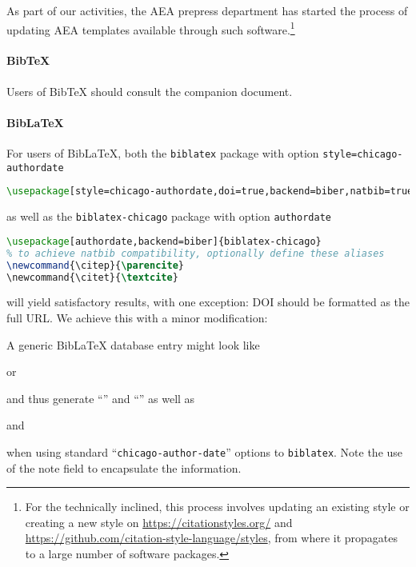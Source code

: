\documentclass[AEJ]{AEA}
\newcommand{\citep}{\parencite}
\newcommand{\citet}{\textcite}
\begin{document}
As part of our activities, the AEA prepress department has started the process of updating AEA templates available through such software.\footnote{For the technically inclined, this process involves updating an existing style or creating a new style on \url{https://citationstyles.org/} and \url{https://github.com/citation-style-language/styles}, from where it propagates to a large number of software packages.}  

\paragraph{BibTeX}
Users of BibTeX should consult the companion document.

\paragraph{BibLaTeX}
\lstset{basicstyle=\small\ttfamily}
For users of BibLaTeX, both the \texttt{biblatex} package with option \texttt{style=chicago-authordate} 
\begin{lstlisting}[language=TeX]
\usepackage[style=chicago-authordate,doi=true,backend=biber,natbib=true]{biblatex}
\end{lstlisting}
as well as the \texttt{biblatex-chicago} package with option \texttt{authordate} 
\begin{lstlisting}[language=TeX]
\usepackage[authordate,backend=biber]{biblatex-chicago}
% to achieve natbib compatibility, optionally define these aliases
\newcommand{\citep}{\parencite}
\newcommand{\citet}{\textcite}
\end{lstlisting}
will yield satisfactory results, with one exception: \ac{DOI} should be formatted as the full URL. We achieve this with a minor modification:


A generic BibLaTeX database entry might look like
\lstset{language=}

%
or

%
and thus generate ``\citet{duflopande2006}'' and ``\citet{leiss1999}'' as well as
%
\begin{quote}
\end{quote}
%
and
%
\begin{quote}
\end{quote}
%
when using standard ``\texttt{chicago-author-date}'' options to \texttt{biblatex}. Note the use of the note field to encapsulate the information.
\end{document}
